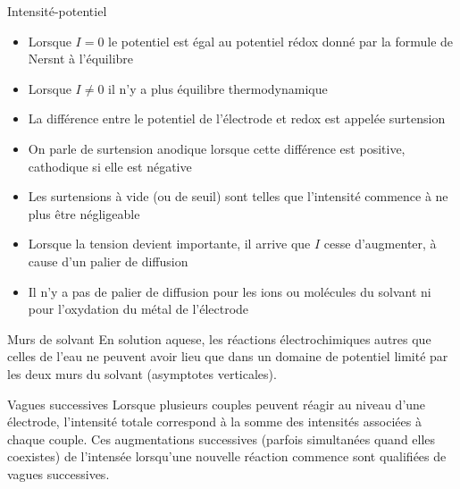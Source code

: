 \documentclass[french, a4paper, 11pt, twocolumn]{article}
\begin{document}
    \begin{cadre}{Intensité-potentiel}
        \begin{itemize}
            \item Lorsque \(I=0\) le potentiel est égal au potentiel rédox donné par la formule de Nersnt à l'équilibre
            \item Lorsque \(I\neq 0\) il n'y a plus équilibre thermodynamique
        \end{itemize}
        \begin{itemize}
            \item La différence entre le potentiel de l'électrode et redox est appelée surtension
            \item On parle de surtension anodique lorsque cette différence est positive, cathodique si elle est négative
            \item Les surtensions à vide (ou de seuil) sont telles que l'intensité commence à ne plus être négligeable
        \end{itemize}
        \begin{itemize}
            \item Lorsque la tension devient importante, il arrive que \(I\) cesse d'augmenter, à cause d'un palier de diffusion
            \item Il n'y a pas de palier de diffusion pour les ions ou molécules du solvant ni pour l'oxydation du métal de l'électrode
        \end{itemize}
    \end{cadre}

    \begin{cadre}{Murs de solvant}
        En solution aquese, les réactions électrochimiques autres que celles de l'eau ne peuvent avoir lieu que dans un
        domaine de potentiel limité par les deux murs du solvant (asymptotes verticales).
    \end{cadre}

    \begin{cadre}{Vagues successives}
        Lorsque plusieurs couples peuvent réagir au niveau d'une électrode, l'intensité totale correspond à la somme des 
        intensités associées à chaque couple. Ces augmentations successives (parfois simultanées quand elles coexistes)
        de l'intensée lorsqu'une nouvelle réaction commence sont qualifiées de vagues successives.
    \end{cadre}
\end{document}
